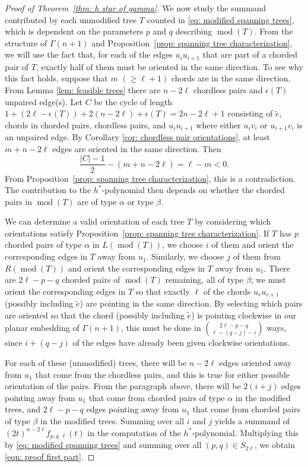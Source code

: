\documentclass{amsart}
\numberwithin{equation}{section}
\theoremstyle{plain}
\theoremstyle{definition}
\DeclareMathOperator{\md}{mod}
\begin{document}
\begin{proof}[Proof of Theorem~\ref{thm: h star of gamma}]
    We now study the summand contributed by each unmodified tree $T$ counted in \eqref{eq: modified spanning trees}, which is dependent on the parameters $p$ and $q$ describing $\md(T)$.
    From the structure of $\Gamma(n+1)$ and Proposition~\ref{prop: spanning tree characterization}, we will use the fact that, 
    for each of the edges $u_iu_{i+1}$ that are part of a chorded pair of $T$, exactly half of them must be 
    oriented in the same direction.
    To see why this fact holds, suppose that $m$ $(\ge \ell+1)$ chords are in the same direction.
    From Lemma \ref{lem: feasible trees} there are $n - 2 \ell$ chordless pairs and $\epsilon(T)$ unpaired edge(s).
    Let $C$ be the cycle of length $1+(2\ell-\epsilon(T)) + 2( n - 2 \ell)+ \epsilon(T)  = 2n-2\ell+1 $ consisting of $\widetilde{e}$, chords in chorded pairs, chordless pairs, and $u_i u_{i+1}$ where either $u_i v_i$ or $u_{i+1}v_i$ is an unpaired edge.
    By Corollary \ref{cor: chordless pair orientations}, at least $m+n - 2 \ell $ edges are oriented in the same direction.
    Then 
    \[
        \frac{|C|-1}{2} -  ( m+n - 2 \ell) =\ell - m <0.
    \]
    From Proposition~\ref{prop: spanning tree characterization}, this is a contradiction.
    The contribution to the $h^*$-polynomial then depends on whether the chorded pairs in $\md(T)$ are of type $\alpha$ or type $\beta$. 
    
    We can determine a valid orientation of each tree $T$ by considering which orientations satisfy Proposition~\ref{prop: spanning tree characterization}.
    If $T$ has $p$ chorded pairs of type $\alpha$ in $L(\md(T))$, we choose $i$ of them and orient the corresponding edges in $T$ away from $u_1$.
    Similarly, we choose $j$ of them from $R(\md(T))$ and orient the corresponding edges in $T$ away from $u_1$.
    There are $2\ell-p-q$ chorded pairs of $\md(T)$ remaining, all of type $\beta$; 
    we must orient the corresponding edges in $T$ so that exactly $\ell$ of the chords $u_ru_{r+1}$ (possibly including $\widetilde{e}$) are pointing in the same direction.
    By selecting which pairs are oriented so that the chord (possibly including $\widetilde{e}$) is pointing clockwise in our planar embedding of $\Gamma(n+1)$, this must be done in $\binom{2\ell-p-q}{\ell-(q-j)-i}$ ways, since $i+(q-j)$ of the edges have already been given clockwise orientations.

    For each of these (unmodified) trees, there will be $n-2\ell$ edges oriented away from $u_1$ that come from the chordless pairs, and this is true for either possible orientation of the pairs.
    From the paragraph above, there will be $2(i+j)$ edges pointing away from $u_1$ that come from chorded pairs of type $\alpha$ in the modified trees, and $2\ell-p-q$ edges pointing away from $u_1$ that come from chorded pairs of type $\beta$ in the modified trees.
    Summing over all $i$ and $j$ yields a summand of $(2t)^{n-2\ell}f_{p,q,\ell}(t)$
    in the computation of the $h^*$-polynomial.
    Multiplying this by \eqref{eq: modified spanning trees} and summing over all $(p,q) \in S_{2\ell}$, we obtain \eqref{eqn: proof first part}.


\end{proof}
\end{document}
